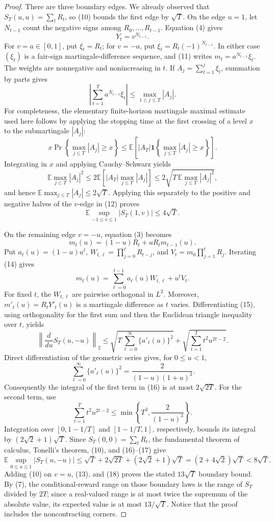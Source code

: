\documentclass{article}
\begin{document}
\begin{proof}
There are three boundary edges.  We already observed that \(S_T(u,u)=\sum_tR_t\), so (10) bounds the first edge by \(\sqrt T\).  On the edge \(u=1\), let \(N_{t-1}\) count the negative signs among \(R_0,\ldots,R_{t-1}\).  Equation (4) gives
\[
 Y_t=v^{N_{t-1}}.
 \tag{11}
\]
For \(v=a\in[0,1]\), put \(\xi_t=R_t\); for \(v=-a\), put \(\xi_t=R_t(-1)^{N_{t-1}}\).  In either case \((\xi_t)\) is a fair-sign martingale-difference sequence, and (11) writes \(m_t=a^{N_{t-1}}\xi_t\).  The weights are nonnegative and nonincreasing in \(t\).  If \(A_j=\sum_{t=1}^j\xi_t\), summation by parts gives
\[
 \left|\sum_{t=1}^T a^{N_{t-1}}\xi_t\right|
 \leq\max_{1\leq j\leq T}|A_j|.
 \tag{12}
\]
For completeness, the elementary finite-horizon martingale maximal estimate used here follows by applying the stopping time at the first crossing of a level \(x\) to the submartingale \(|A_j|\):
\[
 x\Pr\left\{\max_{j\leq T}|A_j|\geq x\right\}
 \leq \mathbb E\left[|A_T|\mathbf 1\left\{\max_{j\leq T}|A_j|\geq x\right\}\right].
\]
Integrating in \(x\) and applying Cauchy--Schwarz yields
\[
 \mathbb E\max_{j\leq T}|A_j|^2
 \leq2\mathbb E\left[|A_T|\max_{j\leq T}|A_j|\right]
 \leq2\sqrt{T\,\mathbb E\max_{j\leq T}|A_j|^2},
\]
and hence \(\mathbb E\max_{j\leq T}|A_j|\leq2\sqrt T\).  Applying this separately to the positive and negative halves of the \(v\)-edge in (12) proves
\[
 \mathbb E\sup_{-1\leq v\leq1}|S_T(1,v)|\leq4\sqrt T.
 \tag{13}
\]

On the remaining edge \(v=-u\), equation (3) becomes
\[
 m_t(u)=(1-u)R_t+uR_tm_{t-1}(u).
 \tag{14}
\]
Put \(a_\ell(u)=(1-u)u^\ell\), \(W_{t,\ell}=\prod_{j=0}^{\ell}R_{t-j}\), and \(V_t=m_0\prod_{j=1}^tR_j\).  Iterating (14) gives
\[
 m_t(u)=\sum_{\ell=0}^{t-1}a_\ell(u)W_{t,\ell}+u^tV_t.
 \tag{15}
\]
For fixed \(t\), the \(W_{t,\ell}\) are pairwise orthogonal in \(L^2\).  Moreover, \(m'_t(u)=R_tY'_t(u)\) is a martingale difference as \(t\) varies.  Differentiating (15), using orthogonality for the first sum and then the Euclidean triangle inequality over \(t\), yields
\[
 \left\|\frac{d}{du}S_T(u,-u)\right\|_2
 \leq
 \sqrt{T\sum_{\ell=0}^{\infty}\{a'_\ell(u)\}^2}
 +\sqrt{\sum_{t=1}^Tt^2u^{2t-2}}.
 \tag{16}
\]
Direct differentiation of the geometric series gives, for \(0\leq u<1\),
\[
 \sum_{\ell=0}^{\infty}\{a'_\ell(u)\}^2
 =\frac{2}{(1-u)(1+u)^3}.
 \tag{17}
\]
Consequently the integral of the first term in (16) is at most \(2\sqrt{2T}\).  For the second term, use
\[
 \sum_{t=1}^Tt^2u^{2t-2}
 \leq\min\left\{T^3,\frac{2}{(1-u)^3}\right\}.
\]
Integration over \([0,1-1/T]\) and \([1-1/T,1]\), respectively, bounds its integral by \((2\sqrt2+1)\sqrt T\).  Since \(S_T(0,0)=\sum_tR_t\), the fundamental theorem of calculus, Tonelli's theorem, (10), and (16)--(17) give
\[
 \mathbb E\sup_{0\leq u\leq1}|S_T(u,-u)|
 \leq\sqrt T+2\sqrt{2T}+(2\sqrt2+1)\sqrt T
 =(2+4\sqrt2)\sqrt T<8\sqrt T.
 \tag{18}
\]
Adding (10) on \(v=u\), (13), and (18) proves the stated \(13\sqrt T\) boundary bound.  By (7), the conditional-reward range on those boundary laws is the range of \(S_T\) divided by \(2T\); since a real-valued range is at most twice the supremum of the absolute value, its expected value is at most \(13/\sqrt T\).  Notice that the proof includes the noncontracting corners.


\end{proof}
\end{document}
